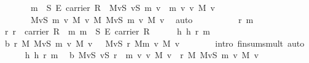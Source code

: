 \begin{isabellebody}
\ \ \ \ \ \ \ m{}\ {\isasymin}\ S\ {\isasymrightarrow}\isactrlsub E\ carrier\ R\ {\isasymLongrightarrow}\ {\isacharparenleft}{\isasymOplus}\isactrlbsub M\isactrlesub v{\isasymin}S{\isachardot}\ {\isacharparenleft}{\isasymlambda}v{\isasymin}S{\isachardot}\ m{}\ v\ {\isasymoplus}\ m{}\ v{\isacharparenright}\ v\ {\isasymodot}\isactrlbsub M\isactrlesub \ v{\isacharparenright}\ {\isacharequal}\isanewline
\ \ \ \ \ \ \ {\isacharparenleft}{\isasymOplus}\isactrlbsub M\isactrlesub v{\isasymin}S{\isachardot}\ m{}\ v\ {\isasymodot}\isactrlbsub M\isactrlesub \ v{\isacharparenright}\ {\isasymoplus}\isactrlbsub M\isactrlesub \ {\isacharparenleft}{\isasymOplus}\isactrlbsub M\isactrlesub v{\isasymin}S{\isachardot}\ m{}\ v\ {\isasymodot}\isactrlbsub M\isactrlesub \ v{\isacharparenright}{\isachardoublequoteclose}\ \isamarkupfalse%
\ auto\isanewline
\ \ \isacommand{{\isacharbraceleft}}\isamarkupfalse%
\ \isanewline
\ \ \ \ \isamarkupfalse%
\ r\ m\isanewline
\ \ \ \ \isamarkupfalse%
\ r{\isacharcolon}\ {\isachardoublequoteopen}r\ {\isasymin}\ carrier\ R{\isachardoublequoteclose}\ \ m{\isacharcolon}\ {\isachardoublequoteopen}m\ {\isasymin}\ S\ {\isasymrightarrow}\isactrlsub E\ carrier\ R{\isachardoublequoteclose}\isanewline
\ \ \ \ \isamarkupfalse%
\ h\ h{}\ r\ m\ \isamarkupfalse%
\ b{}{\isacharcolon}\ {\isachardoublequoteopen}r\ {\isasymodot}\isactrlbsub M\isactrlesub \ {\isacharparenleft}{\isasymOplus}\isactrlbsub M\isactrlesub v{\isasymin}S{\isachardot}\ m\ v\ {\isasymodot}\isactrlbsub M\isactrlesub \ v{\isacharparenright}\ {\isacharequal}\ \ {\isacharparenleft}{\isasymOplus}\isactrlbsub M\isactrlesub v{\isasymin}S{\isachardot}\ r\ {\isasymodot}\isactrlbsub M\isactrlesub {\isacharparenleft}m\ v\ {\isasymodot}\isactrlbsub M\isactrlesub \ v{\isacharparenright}{\isacharparenright}{\isachardoublequoteclose}\isanewline
\ \ \ \ \ \ \isamarkupfalse%
\ {\isacharparenleft}intro\ finsum{\isacharunderscore}smult{\isacharcomma}\ auto{\isacharparenright}\ \isanewline
\ \ \ \ \isamarkupfalse%
\ h\ h{}\ r\ m\ \isamarkupfalse%
\ b{}{\isacharcolon}\ {\isachardoublequoteopen}{\isacharparenleft}{\isasymOplus}\isactrlbsub M\isactrlesub v{\isasymin}S{\isachardot}\ {\isacharparenleft}{\isasymlambda}v{\isasymin}S{\isachardot}\ r\ {\isasymotimes}\ m\ v{\isacharparenright}\ v\ {\isasymodot}\isactrlbsub M\isactrlesub \ v{\isacharparenright}\ {\isacharequal}\ r\ {\isasymodot}\isactrlbsub M\isactrlesub \ {\isacharparenleft}{\isasymOplus}\isactrlbsub M\isactrlesub v{\isasymin}S{\isachardot}\ m\ v\ {\isasymodot}\isactrlbsub M\isactrlesub \ v{\isacharparenright}{\isachardoublequoteclose}\isanewline

\end{isabellebody}
